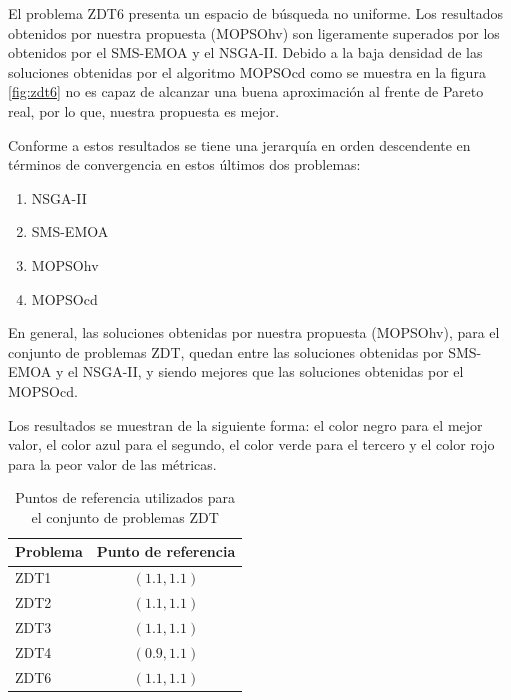   El problema ZDT6 presenta un espacio de b\'usqueda no uniforme. Los resultados obtenidos por nuestra propuesta (MOPSOhv) son ligeramente 
  superados por los obtenidos por el SMS-EMOA y el NSGA-II. Debido a la baja densidad de las soluciones obtenidas por el algoritmo 
  MOPSOcd como se muestra en la figura \ref{fig:zdt6} no es capaz de alcanzar una buena aproximaci\'on al frente de Pareto real, por 
  lo que, nuestra propuesta es mejor.
  
   Conforme a estos resultados se tiene una jerarqu\'ia en orden descendente en t\'erminos de convergencia en estos \'ultimos dos 
  problemas:
  
  \begin{enumerate}
  \item NSGA-II
  \item SMS-EMOA
  \item MOPSOhv
  \item MOPSOcd
\end{enumerate}

  
  En general, las soluciones obtenidas por nuestra propuesta (MOPSOhv), para el conjunto de problemas ZDT, quedan entre las soluciones 
  obtenidas por SMS-EMOA y el NSGA-II, y siendo mejores que las soluciones obtenidas por el MOPSOcd.
	
  Los resultados se muestran de la siguiente forma: el color negro para el mejor valor, el color azul para el segundo, el color 
  verde para el tercero y el color rojo para la peor valor de las m\'etricas.

\begin{table}
  \begin{center}
    \begin{tabular}{|l||c|}
	\hline
	Problema  & Punto de referencia \\ 
	\hline
	\hline
	ZDT1 & $(1.1,1.1)$ \\ 
	\hline
	ZDT2 &  $(1.1,1.1)$\\
	\hline
	ZDT3 &  $(1.1,1.1)$\\
	\hline
	ZDT4 &  $(0.9,1.1)$\\
	\hline
	ZDT6 &  $(1.1,1.1)$\\
	\hline
  \end{tabular}
  \caption{Puntos de referencia utilizados para el conjunto de problemas ZDT}
  \label{tab:ref}
\end{center}
\end{table}

\newpage

